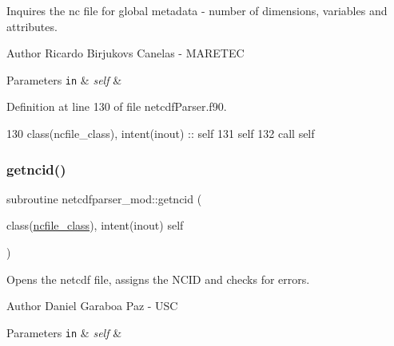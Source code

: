 Inquires the nc file for global metadata -\/ number of dimensions, variables and attributes. 

\begin{DoxyAuthor}{Author}
Ricardo Birjukovs Canelas -\/ M\+A\+R\+E\+T\+EC 
\end{DoxyAuthor}

\begin{DoxyParams}[1]{Parameters}
\mbox{\tt in}  & {\em self} & \\
\hline
\end{DoxyParams}


Definition at line 130 of file netcdf\+Parser.\+f90.


\begin{DoxyCode}
130     \textcolor{keywordtype}{class}(ncfile\_class), \textcolor{keywordtype}{intent(inout)} :: self
131     self%
132     \textcolor{keyword}{call }self%
\end{DoxyCode}
\mbox{\label{namespacenetcdfparser__mod_a741dd5b5985255e73aa9d3cf08755e91}} 
\subsubsection{\texorpdfstring{getncid()}{getncid()}}
{\footnotesize\ttfamily subroutine netcdfparser\+\_\+mod\+::getncid (\begin{DoxyParamCaption}\item[{class(\mbox{\hyperlink{structnetcdfparser__mod_1_1ncfile__class}{ncfile\+\_\+class}}), intent(inout)}]{self }\end{DoxyParamCaption})\hspace{0.3cm}{\ttfamily [private]}}



Opens the netcdf file, assigns the N\+C\+ID and checks for errors. 

\begin{DoxyAuthor}{Author}
Daniel Garaboa Paz -\/ U\+SC 
\end{DoxyAuthor}

\begin{DoxyParams}[1]{Parameters}
\mbox{\tt in}  & {\em self} & \\
\hline
\end{DoxyParams}


